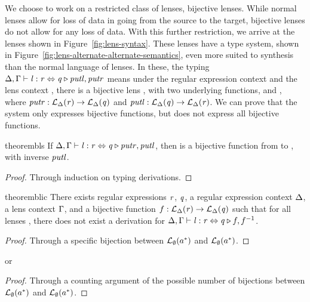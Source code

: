 


We choose to work on a restricted class of lenses,
bijective lenses.
While normal lenses allow for loss of data in going from
the source to the target, bijective lenses do not allow for any loss of data.
With this further restriction, we arrive at the lenses shown in Figure~\ref{fig:lens-syntax}.
These lenses have a type system, shown in Figure~\ref{fig:lens-alternate-alternate-semantics},
even more suited to synthesis than the normal language of lenses.
In these, the typing $\Delta, \Gamma \vdash \mathit{l} : \mathit{r} \Leftrightarrow \mathit{q} \triangleright \mathit{putl},\mathit{putr}$ means
under the regular expression context \RegexContext{} and the lens context \LensContext{},
there is a bijective lens \Lens{}, with two underlying functions,
\PutRight{} and \PutLeft{}, where $\mathit{putr} : \mathcal{L}_{\Delta}(\mathit{r}) \rightarrow \mathcal{L}_{\Delta}(\mathit{q})$
and $\mathit{putl} : \mathcal{L}_{\Delta}(\mathit{q}) \rightarrow \mathcal{L}_{\Delta}(\mathit{r})$.
We can prove that the system only expresses bijective
functions, but does not express all bijective functions.
\begin{restatable}{theorem}{bls}
\label{thm:bij-lens-soundness}
If $\Delta, \Gamma \vdash \mathit{l} : \mathit{r} \Leftrightarrow \mathit{q} \triangleright \mathit{putr},\mathit{putl}$,
then \PutRight{} is a bijective function from \LanguageOf{\Delta{}}{\Regex{}} to \LanguageOf{\Delta{}}{\RegexAlt{}}, with inverse $\mathit{putl}{}$.
\end{restatable}
\begin{proof}
Through induction on typing derivations.
\end{proof}
\begin{restatable}{theorem}{blic}
\label{thm:bij-lens-incompleteness}
There exists regular expressions $\mathit{r}$, $\mathit{q}$,
a regular expression context $\Delta$, a lens context $\Gamma$, and a bijective function $f:\mathcal{L}_{\Delta}(\mathit{r})\rightarrow\mathcal{L}_{\Delta}(\mathit{q})$
such that for all lenses \Lens{}, there does not exist a derivation for
$\Delta, \Gamma \vdash \mathit{l} : \mathit{r} \Leftrightarrow \mathit{q} \triangleright f,f^{-1}$.
\end{restatable}
\begin{proof}
Through a specific bijection between $\mathcal{L}_{\emptyset}(a^*)$ and $\mathcal{L}_{\emptyset}(a^*)$.
\end{proof}
or
\begin{proof}
Through a counting argument of the possible number of bijections between $\mathcal{L}_{\emptyset}(a^*)$ and $\mathcal{L}_{\emptyset}(a^*)$.
\end{proof}

